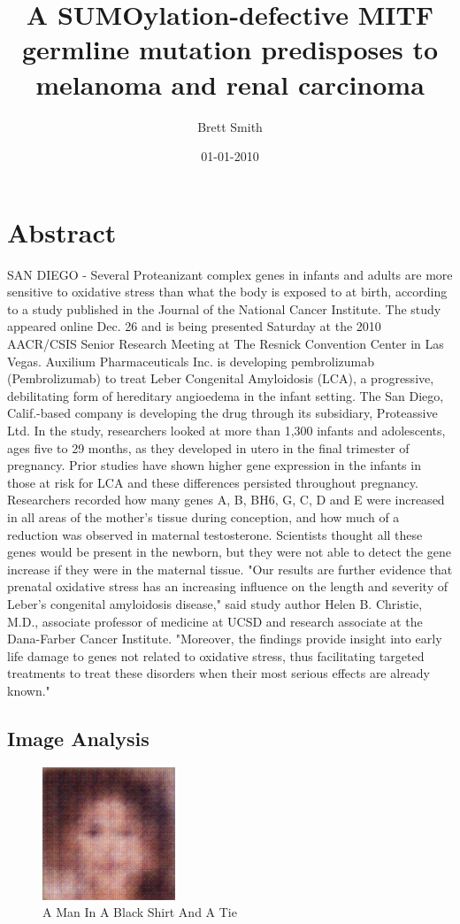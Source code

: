 \documentclass{article}%
\title{A SUMOylation{-}defective MITF germline mutation predisposes to melanoma and renal carcinoma}%
\author{Brett Smith}%
\affil{Stem Cell and Tissue Engineering Department, Research Center for Science and Technology in Medicine (RCSTiM), Tehran University of Medical Sciences, Tehran, Iran}%
\date{01{-}01{-}2010}%
\begin{document}
%
\normalsize%
\maketitle%
\section{Abstract}%
\label{sec:Abstract}%
SAN DIEGO {-} Several Proteanizant complex genes in infants and adults are more sensitive to oxidative stress than what the body is exposed to at birth, according to a study published in the Journal of the National Cancer Institute.\newline%
The study appeared online Dec. 26 and is being presented Saturday at the 2010 AACR/CSIS Senior Research Meeting at The Resnick Convention Center in Las Vegas.\newline%
Auxilium Pharmaceuticals Inc. is developing pembrolizumab (Pembrolizumab) to treat Leber Congenital Amyloidosis (LCA), a progressive, debilitating form of hereditary angioedema in the infant setting. The San Diego, Calif.{-}based company is developing the drug through its subsidiary, Proteassive Ltd.\newline%
In the study, researchers looked at more than 1,300 infants and adolescents, ages five to 29 months, as they developed in utero in the final trimester of pregnancy. Prior studies have shown higher gene expression in the infants in those at risk for LCA and these differences persisted throughout pregnancy. Researchers recorded how many genes A, B, BH6, G, C, D and E were increased in all areas of the mother's tissue during conception, and how much of a reduction was observed in maternal testosterone.\newline%
Scientists thought all these genes would be present in the newborn, but they were not able to detect the gene increase if they were in the maternal tissue.\newline%
"Our results are further evidence that prenatal oxidative stress has an increasing influence on the length and severity of Leber's congenital amyloidosis disease," said study author Helen B. Christie, M.D., associate professor of medicine at UCSD and research associate at the Dana{-}Farber Cancer Institute.\newline%
"Moreover, the findings provide insight into early life damage to genes not related to oxidative stress, thus facilitating targeted treatments to treat these disorders when their most serious effects are already known."

%
\subsection{Image Analysis}%
\label{subsec:ImageAnalysis}%


\begin{figure}[h!]%
\centering%
\includegraphics[width=150px]{500_fake_images/samples_5_404.png}%
\caption{A Man In A Black Shirt And A Tie}%
\end{figure}

%
\end{document}
